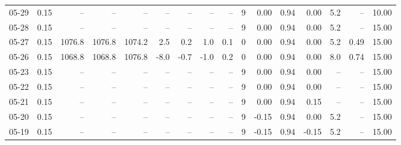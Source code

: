 \begin{threeparttable}
{\begin{tabular}{lrrrrrrrrrrrrrrr}
  05-29 &     0.15 &     -- &     -- &     -- &         -- &             -- &                       -- &                  -- &              9 &       0.00 &      0.94 &           0.00 &              5.2 &              -- &                  10.00 \\
  05-28 &     0.15 &     -- &     -- &     -- &         -- &             -- &                       -- &                  -- &              9 &       0.00 &      0.94 &           0.00 &              5.2 &              -- &                  15.00 \\
  05-27 &     0.15 & 1076.8 & 1076.8 & 1074.2 &        2.5 &            0.2 &                      1.0 &                 0.1 &              0 &       0.00 &      0.94 &           0.00 &              5.2 &            0.49 &                  15.00 \\
  05-26 &     0.15 & 1068.8 & 1068.8 & 1076.8 &       -8.0 &           -0.7 &                     -1.0 &                 0.2 &              0 &       0.00 &      0.94 &           0.00 &              8.0 &            0.74 &                  15.00 \\
  05-23 &     0.15 &     -- &     -- &     -- &         -- &             -- &                       -- &                  -- &              9 &       0.00 &      0.94 &           0.00 &               -- &              -- &                  15.00 \\
  05-22 &     0.15 &     -- &     -- &     -- &         -- &             -- &                       -- &                  -- &              9 &       0.00 &      0.94 &           0.00 &               -- &              -- &                  15.00 \\
  05-21 &     0.15 &     -- &     -- &     -- &         -- &             -- &                       -- &                  -- &              9 &       0.00 &      0.94 &           0.15 &               -- &              -- &                  15.00 \\
  05-20 &     0.15 &     -- &     -- &     -- &         -- &             -- &                       -- &                  -- &              9 &      -0.15 &      0.94 &           0.00 &              5.2 &              -- &                  15.00 \\
  05-19 &     0.15 &     -- &     -- &     -- &         -- &             -- &                       -- &                  -- &              9 &      -0.15 &      0.94 &          -0.15 &              5.2 &              -- &                  15.00 \\

\end{tabular}}
\end{threeparttable}
